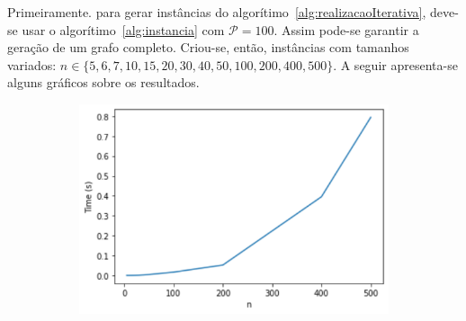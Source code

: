 \documentclass[a4paper,12pt]{report}
\begin{document}
	Primeiramente. para gerar instâncias do algorítimo~\ref{alg:realizacaoIterativa}, deve-se usar o algorítimo~\ref{alg:instancia} com $\mathcal{P} = 100$. Assim pode-se garantir a geração de um grafo completo. Criou-se, então, instâncias com tamanhos variados: $n \in \{5, 6, 7,10,15,20,30,40,50,100,200,400,500\}$. A seguir apresenta-se alguns gráficos sobre os resultados.
	
	\begin{figure}[H]
		\begin{center}
			\begin{minipage}{0.45 \linewidth}
				\begin{figure}[H]
					\begin{center}
						\includegraphics[width=1\linewidth]{figures/tempoTri.png}
					\end{center}
				\end{figure}
			\end{minipage}
			\hspace{0.1cm}
			\begin{minipage}{0.45 \linewidth}
				

\end{minipage}
\end{center}
\end{figure}
\end{document}
